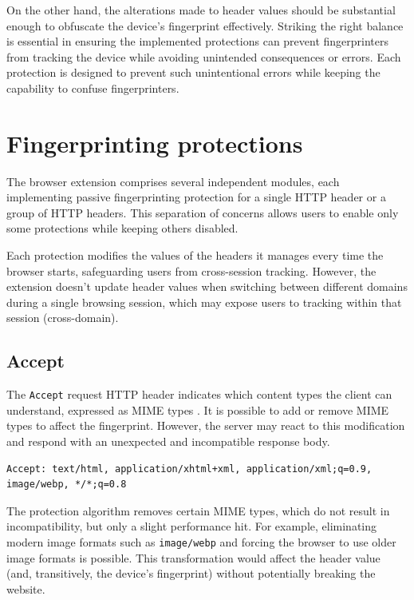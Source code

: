 On the other hand, the alterations made to header values should be substantial enough to obfuscate the device's fingerprint effectively. Striking the right balance is essential in ensuring the implemented protections can prevent fingerprinters from tracking the device while avoiding unintended consequences or errors. Each protection is designed to prevent such unintentional errors while keeping the capability to confuse fingerprinters.

\section{Fingerprinting protections}
\label{Section:ProtectionsDesign}

The browser extension comprises several independent modules, each implementing passive fingerprinting protection for a single HTTP header or a group of HTTP headers. This separation of concerns allows users to enable only some protections while keeping others disabled.

Each protection modifies the values of the headers it manages every time the browser starts, safeguarding users from cross-session tracking. However, the extension doesn't update header values when switching between different domains during a single browsing session, which may expose users to tracking within that session (cross-domain).

\subsection{Accept}
\label{SubSection:HTTPHeaderAccept}

The \texttt{Accept} request HTTP header indicates which content types the client can understand, expressed as MIME types \cite{MDN}. It is possible to add or remove MIME types to affect the fingerprint. However, the server may react to this modification and respond with an unexpected and incompatible response body.

\bigbreak

\begin{lstlisting}[caption={An example of Accept header contents \cite{MDN}.}]
Accept: text/html, application/xhtml+xml, application/xml;q=0.9, image/webp, */*;q=0.8
\end{lstlisting}

\medbreak

The protection algorithm removes certain MIME types, which do not result in incompatibility, but only a slight performance hit. For example, eliminating modern image formats such as \texttt{image/webp} and forcing the browser to use older image formats is possible. This transformation would affect the header value (and, transitively, the device's fingerprint) without potentially breaking the website.

